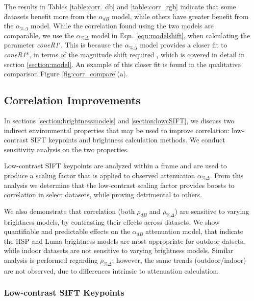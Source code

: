
The results in Tables \ref{table:corr_db} and \ref{table:corr_rgb} indicate that some datasets benefit more from the $\alpha_{dB}$ model, while others have greater benefit from the $\alpha_{\%\Delta}$ model. While the correlation found using the two models are comparable, we use the $\alpha_{\%\Delta}$ model in Eqn. \ref{eqn:modelshift}, when calculating the parameter \textit{coneR1}$'$. This is because the $\alpha_{\%\Delta}$ model provides a closer fit to \textit{coneR1}*, in terms of the magnitude shift required , which is covered in detail in section \ref{section:model}. An example of this closer fit is found in the qualitative comparison Figure \ref{fig:corr_compare}(a).

\subsection{Correlation Improvements} \label{section:corrimprovements}

In sections \ref{section:brightnessmodels} and \ref{section:lowcSIFT}, we discuss two indirect environmental properties that may be used to improve correlation: low-contrast SIFT keypoints and brightness calculation methods. We conduct sensitivity analysis on the two properties.

Low-contrast SIFT keypoints are analyzed within a frame and are used to produce a scaling factor that is applied to observed attenuation $\alpha_{\%\Delta}$. From this analysis we determine that the low-contrast scaling factor provides boosts to correlation in select datasets, while proving detrimental to others.

We also demonstrate that correlation (both $\rho_{dB}$ and $\rho_{\%\Delta}$) are sensitive to varying brightness models, by contrasting their effects across datasets. We show quantifiable and predictable effects on the $\alpha_{dB}$ attenuation model, that indicate the HSP and Luma brightness models are most appropriate for outdoor datsets, while indoor datasets are not sensitive to varying brightness models. Similar analysis is performed regarding $\rho_{\%\Delta}$; however, the same trends (outdoor/indoor) are not observed, due to differences intrinsic to attenuation calculation.

\subsubsection{Low-contrast SIFT Keypoints} \label{section:lowcsensitivity}

